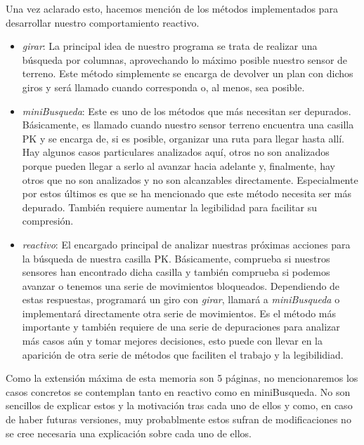 \documentclass[12pt]{article}
\begin{document}
Una vez aclarado esto, hacemos mención de los métodos implementados para desarrollar nuestro comportamiento reactivo.

\begin{itemize}
\item \emph{girar}: La principal idea de nuestro programa se trata de realizar una búsqueda por columnas, aprovechando lo máximo posible nuestro sensor de terreno. Este método simplemente se encarga de devolver un plan con dichos giros y será llamado cuando corresponda o, al menos, sea posible.

\newpage

\item \emph{miniBusqueda}: Este es uno de los métodos que más necesitan ser depurados. Básicamente, es llamado cuando nuestro sensor terreno encuentra una casilla PK y se encarga de, si es posible, organizar una ruta para llegar hasta allí. Hay algunos casos particulares analizados aquí, otros no son analizados porque pueden llegar a serlo al avanzar hacia adelante y, finalmente, hay otros que no son analizados y no son alcanzables directamente. Especialmente por estos últimos es que se ha mencionado que este método necesita ser más depurado. También requiere aumentar la legibilidad para facilitar su compresión. 

\item \emph{reactivo}: El encargado principal de analizar nuestras próximas acciones para la búsqueda de nuestra casilla PK. Básicamente, comprueba si nuestros sensores han encontrado dicha casilla y también comprueba si podemos avanzar o tenemos una serie de movimientos bloqueados. Dependiendo de estas respuestas, programará un giro con \emph{girar}, llamará a \emph{miniBusqueda} o implementará directamente otra serie de movimientos. Es el método más importante y también requiere de una serie de depuraciones para analizar más casos aún y tomar mejores decisiones, esto puede con llevar en la aparición de otra serie de métodos que faciliten el trabajo y la legibilidiad.

\end{itemize}

Como la extensión máxima de esta memoria son 5 páginas, no mencionaremos los casos concretos se contemplan tanto en reactivo como en miniBusqueda. No son sencillos de explicar estos y la motivación tras cada uno de ellos y como, en caso de haber futuras versiones, muy probablmente estos sufran de modificaciones no se cree necesaria una explicación sobre cada uno de ellos.
\end{document}

